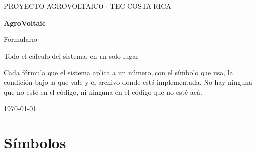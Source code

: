 \documentclass[11pt,a4paper]{article}
\begin{document}
\begin{titlepage}
\centering
\vspace*{3.5cm}
{\color{humo}\large PROYECTO AGROVOLTAICO $\cdot$ TEC COSTA RICA\par}
\vspace{1.2cm}
{\Huge\bfseries\color{agua} AgroVoltaic\par}
\vspace{0.4cm}
{\LARGE Formulario\par}
\vspace{1.2cm}
{\large\color{tinta} Todo el cálculo del sistema, en un solo lugar\par}
\vfill
\begin{minipage}{0.82\textwidth}
\small\color{tinta}
Cada fórmula que el sistema aplica a un número, con el símbolo que usa, la condición
bajo la que vale y el archivo donde está implementada. No hay ninguna que no esté en
el código, ni ninguna en el código que no esté acá.
\end{minipage}
\vfill
{\color{humo} \today\par}
\end{titlepage}

\tableofcontents
\newpage

\section{Símbolos}
\end{document}
